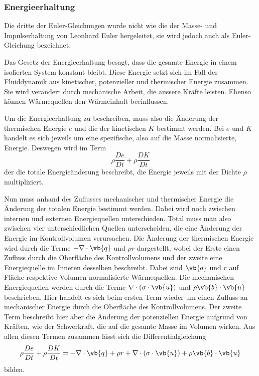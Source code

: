 \subsubsection{Energieerhaltung}
Die dritte der Euler-Gleichungen wurde nicht wie die der Masse- und Impulserhaltung von Leonhard Euler hergeleitet, sie wird jedoch auch als Euler-Gleichung bezeichnet.

Das Gesetz der Energieerhaltung besagt, dass die gesamte Energie in einem isolierten System konstant bleibt.
Diese Energie setzt sich im Fall der Fluiddynamik aus kinetischer, potenzieller und thermischer Energie zusammen.
Sie wird verändert durch mechanische Arbeit, die äussere Kräfte leisten. Ebenso können Wärmequellen den Wärmeinhalt beeinflussen.

Um die Energieerhaltung zu beschreiben, muss also die Änderung der thermischen Energie $e$ und die der kinetischen $K$ bestimmt werden.
Bei $e$ und  $K$ handelt es sich jeweils um eine spezifische, also auf die Masse normalisierte, Energie.
Deswegen wird im Term 
\[\rho \frac{De}{Dt}+  \rho \frac{DK}{Dt}
\]
der die totale Energieänderung beschreibt, die Energie jeweils mit der Dichte $\rho$ multipliziert.

Nun muss anhand des Zuflusses mechanischer und thermischer Energie die Änderung der totalen Energie bestimmt werden.
Dabei wird noch zwischen internen und externen Energiequellen unterschieden.
Total muss man also zwischen vier unterschiedlichen Quellen unterscheiden, die eine Änderung der Energie im Kontrollvolumen verursachen.
Die Änderung der thermischen Energie wird durch die Terme  $- \nabla \cdot \vb{q}$ und  $\rho r$ dargestellt, wobei der Erste einen Zufluss durch die Oberfläche des Kontrollvolumens und der zweite eine Energiequelle im Inneren desselben beschreibt.
Dabei sind $\vb{q}$ und $r$ auf Fläche respektive Volumen normalisierte Wärmequellen.
Die mechanischen Energiequellen werden durch die Terme $\nabla \cdot (\sigma \cdot \vb{u})$ und $\rho \vb{b} \cdot \vb{u}$ beschrieben.
Hier handelt es sich beim ersten Term wieder um einen Zufluss an mechanischer Energie durch die Oberfläche des Kontrollvolumens.  Der zweite Term beschreibt hier aber die Änderung der potenziellen Energie aufgrund von Kräften, wie der Schwerkraft, die auf die gesamte Masse im Volumen wirken.
Aus allen diesen Termen zusammen lässt sich die Differentialgleichung
\begin{equation}
\label{openfoam:euler3}
\rho \frac{De}{Dt}+  \rho \frac{DK}{Dt}
=
- \nabla \cdot \vb{q} + \rho r + \nabla \cdot (\sigma \cdot \vb{u}) + \rho \vb{b} \cdot \vb{u} 
\end{equation} 
bilden.


